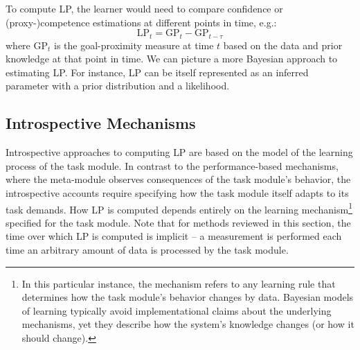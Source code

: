 To compute \ac{LP}, the learner would need to compare confidence or (proxy-)competence estimations at different points in time, e.g.:
\begin{equation}
   \mathrm{LP}_t = \mathrm{GP}_{t} - \mathrm{GP}_{t-\tau}
\end{equation}
where $\mathrm{GP}_t$ is the goal-proximity measure at time $t$ based on the data and prior knowledge at that point in time. We can picture a more Bayesian approach to estimating \ac{LP}. For instance, \ac{LP} can be itself represented as an inferred parameter with a prior distribution and a likelihood. 

\subsection{Introspective  Mechanisms}\label{subsec:introspective_approaches}

Introspective approaches to computing \ac{LP} are based on the model of the learning process of the task module. In contrast to the performance-based mechanisms, where the meta-module observes consequences of the task module's behavior, the introspective accounts require specifying how the task module itself adapts to its task demands. How \ac{LP} is computed depends entirely on the learning mechanism\footnote{In this particular instance, the mechanism refers to any learning rule that determines how the task module's behavior changes by data. Bayesian models of learning typically avoid implementational claims about the underlying mechanisms, yet they describe how the system's knowledge changes (or how it should change).} specified for the task module. Note that for methods reviewed in this section, the time over which \ac{LP} is computed is implicit -- a measurement is performed each time an arbitrary amount of data is processed by the task module.

